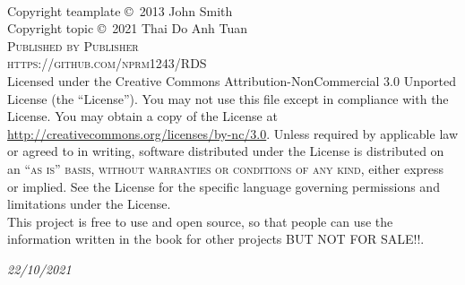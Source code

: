 \documentclass[11pt,fleqn]{book} %
\begin{document}




\newpage
~\vfill
\thispagestyle{empty}

\noindent Copyright teamplate \copyright\ 2013 John Smith\\ %
\noindent Copyright topic \copyright\ 2021 Thai Do Anh Tuan \\ %
\noindent \textsc{Published by Publisher}\\ %

\noindent \textsc{https://github.com/nprm1243/RDS}\\ %

\noindent Licensed under the Creative Commons Attribution-NonCommercial 3.0 Unported License (the ``License''). You may not use this file except in compliance with the License. You may obtain a copy of the License at \url{http://creativecommons.org/licenses/by-nc/3.0}. Unless required by applicable law or agreed to in writing, software distributed under the License is distributed on an \textsc{``as is'' basis, without warranties or conditions of any kind}, either express or implied. See the License for the specific language governing permissions and limitations under the License.\\ %

\noindent This project is free to use and open source, so that people can use the information written in the book for other projects BUT NOT FOR SALE!!.

\noindent \textit{22/10/2021} %



\end{document}
